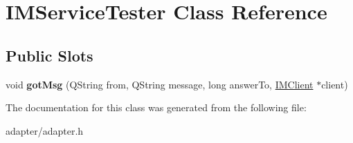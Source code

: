 \hypertarget{classIMServiceTester}{
\section{IMServiceTester Class Reference}
\label{classIMServiceTester}
}
\subsection*{Public Slots}
\begin{DoxyCompactItemize}
\item 
\hypertarget{classIMServiceTester_a0e7fd34df3f658ad8fcb551393ac80aa}{
void {\bfseries gotMsg} (QString from, QString message, long answerTo, \hyperlink{classIMClient}{IMClient} $\ast$client)}
\label{classIMServiceTester_a0e7fd34df3f658ad8fcb551393ac80aa}

\end{DoxyCompactItemize}


The documentation for this class was generated from the following file:\begin{DoxyCompactItemize}
\item 
adapter/adapter.h\end{DoxyCompactItemize}
